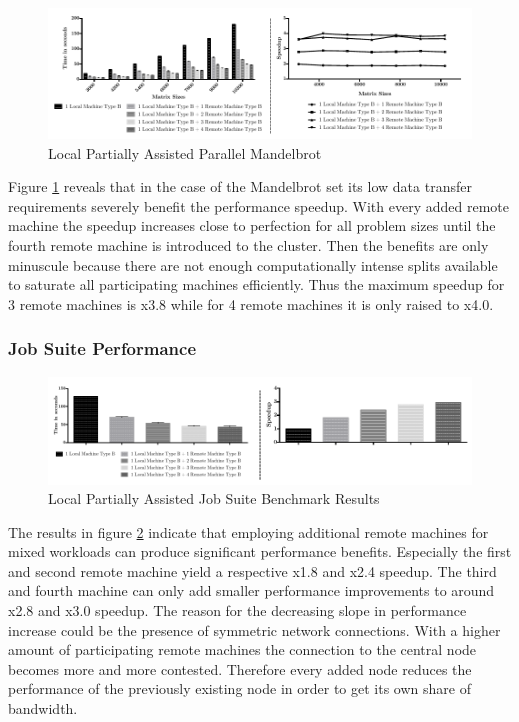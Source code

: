 \begin{figure}[H]
	
	\includegraphics[width=1.0\textwidth]{images/local_partially_assisted_mandelbrot.pdf}
	\centering
	\caption{Local Partially Assisted Parallel Mandelbrot}
	\label{img:parallel_mandelbrot}
\end{figure}

Figure \ref{img:parallel_mandelbrot} reveals that in the case of the Mandelbrot set its low data transfer requirements severely benefit the performance speedup. With every added remote machine the speedup increases close to perfection for all problem sizes until the fourth remote machine is introduced to the cluster. Then the benefits are only minuscule because there are not enough computationally intense splits available to saturate all participating machines efficiently. Thus the maximum speedup for 3 remote machines is x3.8 while for 4 remote machines it is only raised to x4.0.


\subsubsection*{Job Suite Performance}
\label{job_suite_performance}

\begin{figure}[H]
	
	\includegraphics[width=1.0\textwidth]{images/local_partially_assisted_full_benchmark.pdf}
	\centering
	\caption{Local Partially Assisted Job Suite Benchmark Results}
	\label{img:local_benchmark_results}
\end{figure}

The results in figure \ref{img:local_benchmark_results} indicate that employing additional remote machines for mixed workloads can produce significant performance benefits. Especially the first and second remote machine yield a respective x1.8 and x2.4 speedup. The third and fourth machine can only add smaller performance improvements to around x2.8 and x3.0 speedup. The reason for the decreasing slope in performance increase could be the presence of symmetric network connections. With a higher amount of participating remote machines the connection to the central node becomes more and more contested. Therefore every added node reduces the performance of the previously existing node in order to get its own share of bandwidth.


